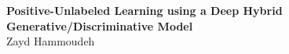 \documentclass[10pt]{article}
\begin{document}
\begin{center}
  {\Large \textbf{Positive-Unlabeled Learning using a Deep Hybrid Generative/Discriminative Model}}
  \\\vspace{6pt}
  Zayd Hammoudeh
\end{center}






\end{document}
